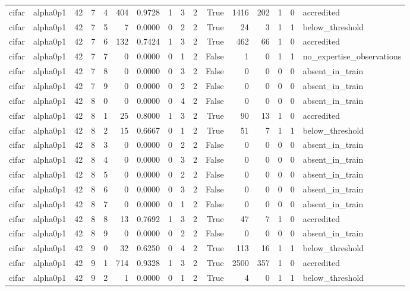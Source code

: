 \begin{tabular}{llrrrrrrrrrrrrrl}
cifar & alpha0p1 & 42 & 7 & 4 & 404 & 0.9728 & 1 & 3 & 2 & True & 1416 & 202 & 1 & 0 & accredited \\
cifar & alpha0p1 & 42 & 7 & 5 & 7 & 0.0000 & 0 & 2 & 2 & True & 24 & 3 & 1 & 1 & below\_threshold \\
cifar & alpha0p1 & 42 & 7 & 6 & 132 & 0.7424 & 1 & 3 & 2 & True & 462 & 66 & 1 & 0 & accredited \\
cifar & alpha0p1 & 42 & 7 & 7 & 0 & 0.0000 & 0 & 1 & 2 & False & 1 & 0 & 1 & 1 & no\_expertise\_observations \\
cifar & alpha0p1 & 42 & 7 & 8 & 0 & 0.0000 & 0 & 3 & 2 & False & 0 & 0 & 0 & 0 & absent\_in\_train \\
cifar & alpha0p1 & 42 & 7 & 9 & 0 & 0.0000 & 0 & 2 & 2 & False & 0 & 0 & 0 & 0 & absent\_in\_train \\
cifar & alpha0p1 & 42 & 8 & 0 & 0 & 0.0000 & 0 & 4 & 2 & False & 0 & 0 & 0 & 0 & absent\_in\_train \\
cifar & alpha0p1 & 42 & 8 & 1 & 25 & 0.8000 & 1 & 3 & 2 & True & 90 & 13 & 1 & 0 & accredited \\
cifar & alpha0p1 & 42 & 8 & 2 & 15 & 0.6667 & 0 & 1 & 2 & True & 51 & 7 & 1 & 1 & below\_threshold \\
cifar & alpha0p1 & 42 & 8 & 3 & 0 & 0.0000 & 0 & 2 & 2 & False & 0 & 0 & 0 & 0 & absent\_in\_train \\
cifar & alpha0p1 & 42 & 8 & 4 & 0 & 0.0000 & 0 & 3 & 2 & False & 0 & 0 & 0 & 0 & absent\_in\_train \\
cifar & alpha0p1 & 42 & 8 & 5 & 0 & 0.0000 & 0 & 2 & 2 & False & 0 & 0 & 0 & 0 & absent\_in\_train \\
cifar & alpha0p1 & 42 & 8 & 6 & 0 & 0.0000 & 0 & 3 & 2 & False & 0 & 0 & 0 & 0 & absent\_in\_train \\
cifar & alpha0p1 & 42 & 8 & 7 & 0 & 0.0000 & 0 & 1 & 2 & False & 0 & 0 & 0 & 0 & absent\_in\_train \\
cifar & alpha0p1 & 42 & 8 & 8 & 13 & 0.7692 & 1 & 3 & 2 & True & 47 & 7 & 1 & 0 & accredited \\
cifar & alpha0p1 & 42 & 8 & 9 & 0 & 0.0000 & 0 & 2 & 2 & False & 0 & 0 & 0 & 0 & absent\_in\_train \\
cifar & alpha0p1 & 42 & 9 & 0 & 32 & 0.6250 & 0 & 4 & 2 & True & 113 & 16 & 1 & 1 & below\_threshold \\
cifar & alpha0p1 & 42 & 9 & 1 & 714 & 0.9328 & 1 & 3 & 2 & True & 2500 & 357 & 1 & 0 & accredited \\
cifar & alpha0p1 & 42 & 9 & 2 & 1 & 0.0000 & 0 & 1 & 2 & True & 4 & 0 & 1 & 1 & below\_threshold \\

\end{tabular}
